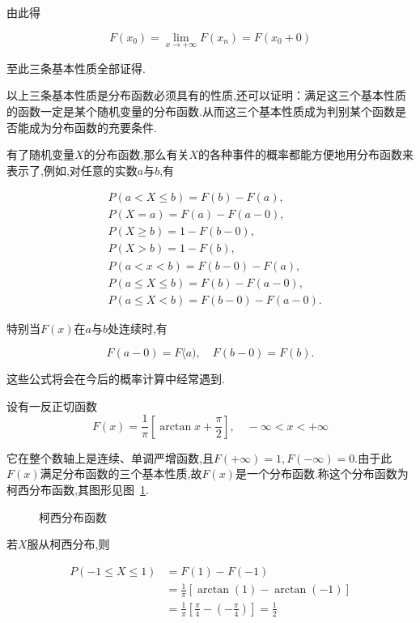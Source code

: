 由此得

\[
F\left(x_{0}\right)=\lim _{x \rightarrow+\infty} F\left(x_{n}\right)=F\left(x_{0}+0\right)
\]

至此三条基本性质全部证得.

以上三条基本性质是分布函数必须具有的性质,还可以证明：满足这三个基本性质的函数一定是某个随机变量的分布函数.从而这三个基本性质成为判别某个函数是否能成为分布函数的充要条件.

有了随机变量$ X $的分布函数,那么有关$ X $的各种事件的概率都能方便地用分布函数来表示了,例如,对任意的实数$ a $与$ b $,有

\begin{align*}
  &P(a<X \leqslant b) = F(b)-F(a),\\
  &P(X=a) = F(a)-F(a-0), \\
  &P(X \geqslant b) = 1-F(b-0), \\
  &P(X>b) = 1-F(b), \\
  &P(a<x<b) = F(b-0)-F(a), \\
  &P(a \leqslant X \leqslant b) = F(b)-F(a-0), \\
  &P(a \leqslant X<b) = F(b-0)-F(a-0).
\end{align*}

特别当$ F(x) $在$ a $与$ b $处连续时,有

\[
F(a-0)=F\langle a), \quad F(b-0)=F(b).
\]

这些公式将会在今后的概率计算中经常遇到.

\begin{example}
	设有一反正切函数
	\[
	F(x)=\frac{1}{\pi}\left[\arctan x+\frac{\pi}{2}\right], \quad-\infty<x<+\infty
	\]
	
	它在整个数轴上是连续、单调严增函数,且$F(+\infty)=1, F(-\infty)=0$.由于此$ F(x) $满足分布函数的三个基本性质,故$ F(x) $是一个分布函数.称这个分布函数为柯西分布函数,其图形见图~\ref{fig:2-1-1}.
	
	\begin{figure}[!ht]
  \centering
{}
  \caption{柯西分布函数}\label{fig:2-1-1}
\end{figure}
	
	若$X$服从柯西分布,则
	
	\[
	\begin{aligned} P(-1 \leqslant X \leqslant 1) &=F(1)-F(-1) \\ &=\frac{1}{\pi}[\arctan (1)-\arctan (-1)] \\ &=\frac{1}{\pi}\left[\frac{\pi}{4}-\left(-\frac{\pi}{4}\right)\right]=\frac{1}{2} \end{aligned}
	\]
	
\end{example}

